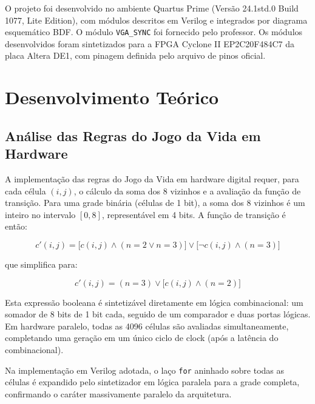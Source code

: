 \documentclass[12pt, a4paper]{article}
\begin{document}
	O projeto foi desenvolvido no ambiente Quartus Prime (Versão 24.1std.0 Build 1077,
	Lite Edition), com módulos descritos em Verilog e integrados por diagrama
	esquemático BDF. O módulo \texttt{VGA\_SYNC} foi fornecido pelo professor. Os
	módulos desenvolvidos foram sintetizados para a FPGA Cyclone II EP2C20F484C7
	da placa Altera DE1, com pinagem definida pelo arquivo de pinos oficial.
	
	\section{Desenvolvimento Teórico}
	
	\subsection{Análise das Regras do Jogo da Vida em Hardware}
	
	A implementação das regras do Jogo da Vida em hardware digital requer, para cada
	célula $(i,j)$, o cálculo da soma dos 8 vizinhos e a avaliação da função de
	transição. Para uma grade binária (células de 1 bit), a soma dos 8 vizinhos
	é um inteiro no intervalo $[0, 8]$, representável em 4 bits. A função de
	transição é então:
	
	\begin{equation}
		c'(i,j) = \bigl[c(i,j) \wedge (n=2 \vee n=3)\bigr]
		\vee \bigl[\neg c(i,j) \wedge (n=3)\bigr]
		\label{eq:hw_rule}
	\end{equation}
	
	\noindent que simplifica para:
	
	\begin{equation}
		c'(i,j) = (n = 3) \vee \bigl[c(i,j) \wedge (n = 2)\bigr]
		\label{eq:hw_rule_simplified}
	\end{equation}
	
	Esta expressão booleana é sintetizável diretamente em lógica combinacional:
	um somador de 8 bits de 1 bit cada, seguido de um comparador e duas portas
	lógicas. Em hardware paralelo, todas as 4096 células são avaliadas
	simultaneamente, completando uma geração em um único ciclo de clock (após a
	latência do combinacional).
	
	Na implementação em Verilog adotada, o laço \texttt{for} aninhado sobre todas
	as células é expandido pelo sintetizador em lógica paralela para a grade completa,
	confirmando o caráter massivamente paralelo da arquitetura.
	
\end{document}
